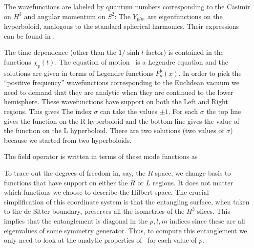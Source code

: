 The wavefunctions are labeled by quantum numbers corresponding to the Casimir on $H^3$ and angular momentum on $S^2$:
\eqn{}
The $Y_{plm}$ are eigenfunctions on the hyperboloid, analogous to the standard spherical harmonics. Their expressions can be found in \SasakiYT . 

The time dependence (other than the $1/\sinh t$ factor) is contained in the functions $\chi_p(t)$. The equation of motion \eomhyp\ is a Legendre equation and the solutions are given in terms of
Legendre functions $P_a^b(x)$.
In order to pick the ``positive frequency'' wavefunctions corresponding to the Euclidean vacuum
we need to demand that they are
analytic when they are continued to the lower hemisphere. These wavefunctions have support
on both the Left and Right regions. This gives \SasakiYT
\eqn{}
The index $\sigma$ can take the values $\pm 1$.  For each $\sigma$ the top line gives the function on the
R hyperboloid and the bottom line gives the value of the function on the L hyperboloid.  There are two solutions (two values of $\sigma$) because we started from  two hyperboloids.

The field operator is written in terms of these mode functions as
\eqn{}

To trace out the degrees of freedom in, say, the $R$ space, we change basis to functions that have support on either the $R$ or $L$ regions. It does not matter which functions we choose to describe the Hilbert space.
The crucial simplification of this coordinate system is that
the entangling surface, when taken to the de Sitter boundary, preserves all the isometries of the
$H^3$ slices. This implies that the entanglement is diagonal in the $p,l,m$ indices since these are
all eigenvalues of some symmetry generator. Thus, to compute this entanglement we only need to
look at the analytic properties of \wavef\ for each value of $p$.


